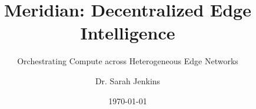 
\usepackage[utf8]{inputenc}
\usepackage[T1]{fontenc}
\usepackage{amsmath}
\usepackage{amssymb}
\usepackage{booktabs}
\usepackage{tikz}
\usetikzlibrary{positioning,calc,shapes.geometric,backgrounds}
\usepackage{fontawesome5}
\usepackage{microtype}


\title{Meridian: Decentralized Edge Intelligence}
\subtitle{Orchestrating Compute across Heterogeneous Edge Networks}
\author{Dr. Sarah Jenkins}
\date{\today}
